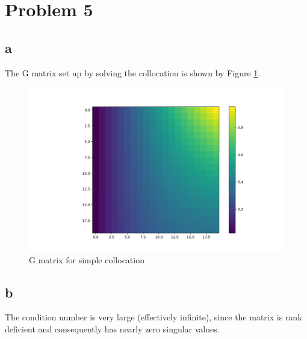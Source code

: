 \documentclass{article}
\begin{document}
\newpage

\section*{Problem 5}
\subsection*{a}
The G matrix set up by solving the collocation is shown by Figure \ref{Gmat5}. 

\begin{figure}[hb!]
    \centering
    \includegraphics[width=4.5in]{p5G.png}
    \caption{G matrix for simple collocation}
    \label{Gmat5}
\end{figure}

\subsection*{b}
The condition number is very large (effectively infinite), since the matrix is rank deficient and consequently has nearly zero singular values.
\end{document}
